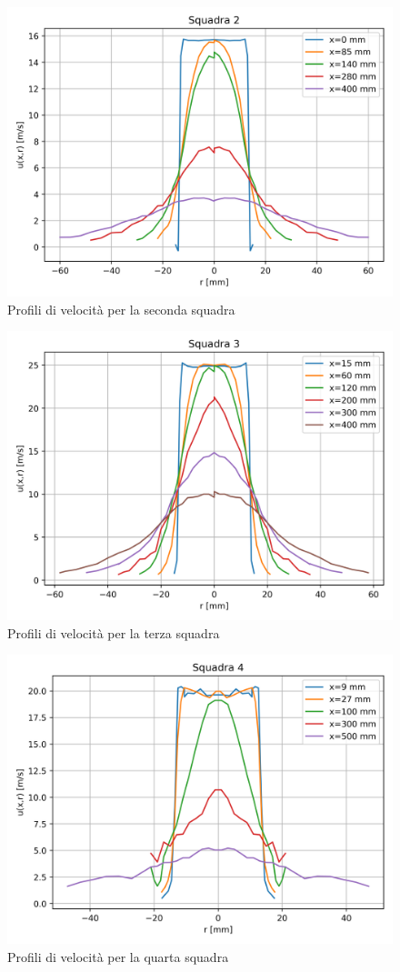 \begin{figure}[ht]
    \centering
    \includegraphics[width=.85\textwidth]{images/3/sq2.png}
    \caption{Profili di velocità per la seconda squadra}
\end{figure}
\begin{figure}[H]
    \centering
    \includegraphics[width=.85\textwidth]{images/3/sq3.png}
    \caption{Profili di velocità per la terza squadra}
\end{figure}
\begin{figure}[ht]
    \centering
    \includegraphics[width=.8\textwidth]{images/3/sq4.png}
    \caption{Profili di velocità per la quarta squadra}
\end{figure}

